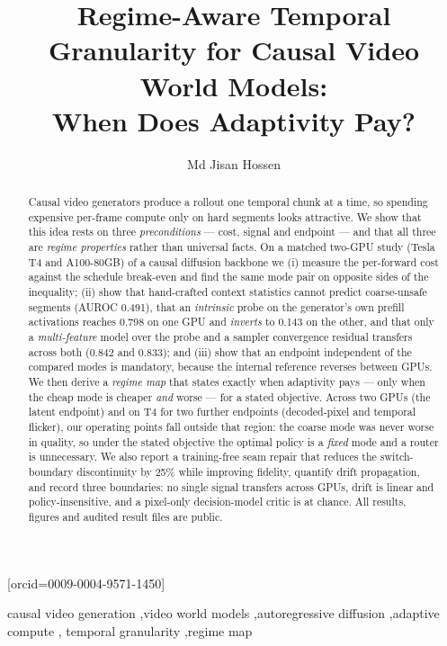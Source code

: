 \documentclass[review]{cas-sc}          %
\begin{document}
\title[mode=title]{Regime-Aware Temporal Granularity for Causal Video World Models:\\
When Does Adaptivity Pay?}

\author[1]{Md Jisan Hossen}[orcid=0009-0004-9571-1450]

\begin{abstract}
Causal video generators produce a rollout one temporal chunk at a time, so spending expensive per-frame
compute only on hard segments looks attractive. We show that this idea rests on three
\emph{preconditions} --- cost, signal and endpoint --- and that all three are \emph{regime properties}
rather than universal facts. On a matched two-GPU study (Tesla T4 and A100-80GB) of a causal diffusion
backbone we (i) measure the per-forward cost against the schedule break-even and find the same mode pair
on opposite sides of the inequality; (ii) show that hand-crafted context statistics cannot predict coarse-unsafe
segments (AUROC 0.491), that an \emph{intrinsic} probe on the generator's own prefill activations reaches
0.798 on one GPU and \emph{inverts} to 0.143 on the other, and that only a \emph{multi-feature} model over
the probe and a sampler convergence residual transfers across both (0.842 and 0.833); and (iii) show that
an endpoint independent of the compared modes is mandatory, because the internal reference reverses
between GPUs. We then derive a \emph{regime map} that states exactly when adaptivity pays --- only when
the cheap mode is cheaper \emph{and} worse --- for a stated objective. Across two GPUs (the latent
endpoint) and on T4 for two further endpoints (decoded-pixel and temporal flicker), our operating points
fall outside that region: the coarse mode was never worse in quality, so under the stated objective the
optimal policy is a \emph{fixed} mode and a router is unnecessary. We also report a training-free seam repair that reduces the switch-boundary discontinuity by
25\% while improving fidelity, quantify drift propagation, and record three boundaries: no single signal
transfers across GPUs, drift is linear and policy-insensitive, and a pixel-only decision-model critic
is at chance. All results, figures and audited result files are public.
\end{abstract}

\begin{keywords}
causal video generation \sep video world models \sep autoregressive diffusion \sep adaptive compute \sep
temporal granularity \sep regime map
\end{keywords}
\end{document}
